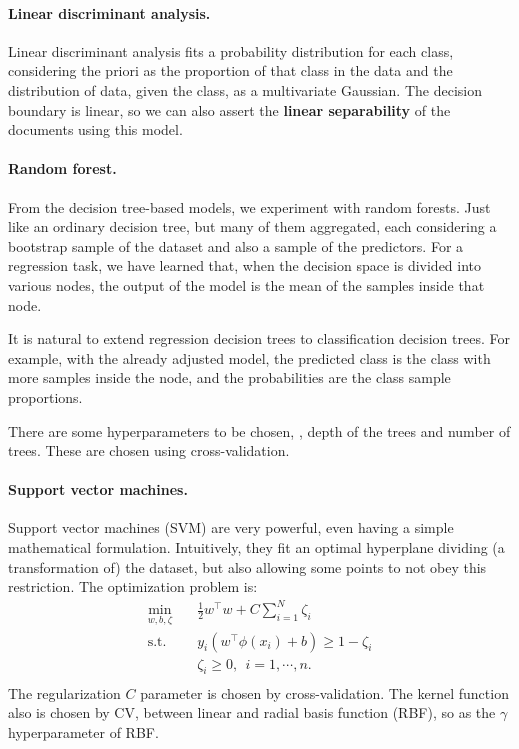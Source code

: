     \paragraph{Linear discriminant analysis.} Linear discriminant analysis fits a probability distribution for each class, considering the priori as the proportion of that class in the data and the distribution of data, given the class, as a multivariate Gaussian. The decision boundary is linear, so we can also assert the \textbf{linear separability} of the documents using this model.

    \paragraph{Random forest.} From the decision tree-based models, we experiment with random forests. Just like an ordinary decision tree, but many of them aggregated, each considering a bootstrap sample of the dataset and also a sample of the predictors. For a regression task, we have learned that, when the decision space is divided into various nodes, the output of the model is the mean of the samples inside that node.

    It is natural to extend regression decision trees to classification decision trees. For example, with the already adjusted model, the predicted class is the class with more samples inside the node, and the probabilities are the class sample proportions.

    There are some hyperparameters to be chosen, \eg, depth of the trees and number of trees. These are chosen using cross-validation.

    \paragraph{Support vector machines.} Support vector machines (SVM) are very powerful, even having a simple mathematical formulation. Intuitively, they fit an optimal hyperplane dividing (a transformation of) the dataset, but also allowing some points to not obey this restriction. The optimization problem is:
    \[\begin{aligned}
        \min_{w, b, \zeta} \quad & \frac{1}{2}w^\intercal w + C \sum_{i = 1}^{N}{\zeta_i} \\
        \textrm{s.t.} \quad & y_i (w^\intercal \phi(x_i) + b) \ge 1 - \zeta_i \\
        & \zeta_i \ge 0, \ \ i = 1, \cdots, n. \\
    \end{aligned}\]
    The regularization $C$ parameter is chosen by cross-validation. The kernel function also is chosen by CV, between linear and radial basis function (RBF), so as the $\gamma$ hyperparameter of RBF.

